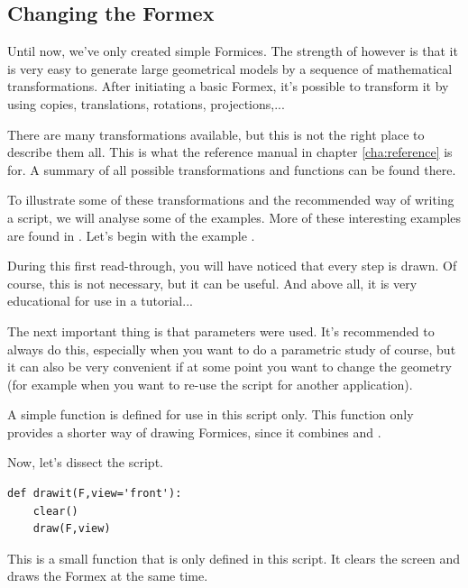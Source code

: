 \subsection{Changing the Formex}
\label{subsec:changing}
Until now, we've only created simple Formices. The strength of \pyformex however is that it is very easy to generate large geometrical models by a sequence of mathematical transformations. After initiating a basic Formex, it's possible to transform it by using copies, translations, rotations, projections,...

There are many transformations available, but this is not the right place to describe them all. This is what the reference manual in chapter \ref{cha:reference} is for. A summary of all possible transformations and functions can be found there.

To illustrate some of these transformations and the recommended way of writing a script, we will analyse some of the examples. More of these interesting examples are found in . Let's begin with the example . 



During this first read-through, you will have noticed that every step is drawn. Of course, this is not necessary, but it can be useful. And above all, it is very educational for use in a tutorial...

The next important thing is that parameters were used. It's recommended to always do this, especially when you want to do a parametric study of course, but it can also be very convenient if at some point you want to change the geometry (for example when you want to re-use the script for another application).

A simple function  is defined for use in this script only. This function only provides a shorter way of drawing Formices, since it combines  and . 

Now, let's dissect the script.

\begin{verbatim}
def drawit(F,view='front'):
    clear()
    draw(F,view)
\end{verbatim}
This is a small function that is only defined in this script. It clears the screen and draws the Formex at the same time. 

